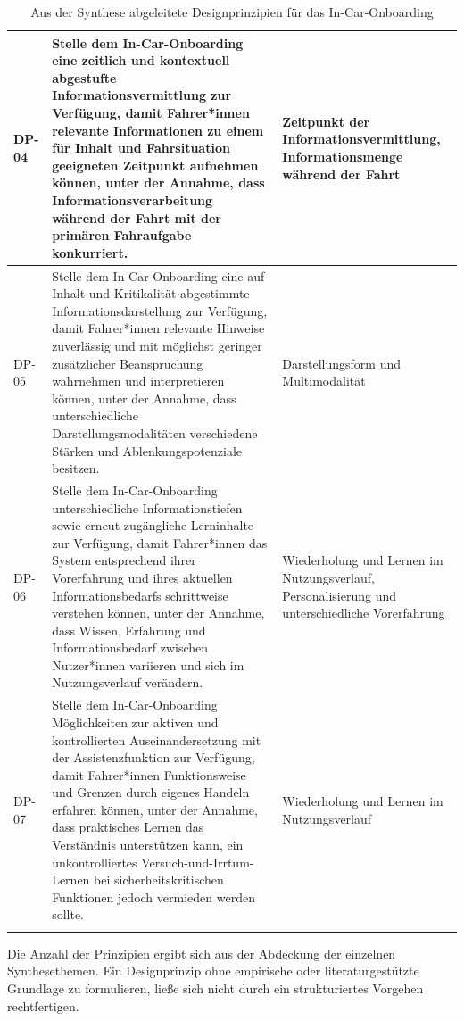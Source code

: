 {\begin{xltabular}{\textwidth}{
    |P{0.07\textwidth}
    |Y
    |P{0.24\textwidth}|
}
DP-04 &
Stelle dem In-Car-Onboarding eine zeitlich und kontextuell abgestufte
Informationsvermittlung zur Verfügung, damit Fahrer*innen relevante
Informationen zu einem für Inhalt und Fahrsituation geeigneten Zeitpunkt
aufnehmen können, unter der Annahme, dass Informationsverarbeitung während der
Fahrt mit der primären Fahraufgabe konkurriert. &
Zeitpunkt der Informationsvermittlung, Informationsmenge während der Fahrt
\\
\hline

DP-05 &
Stelle dem In-Car-Onboarding eine auf Inhalt und Kritikalität abgestimmte
Informationsdarstellung zur Verfügung, damit Fahrer*innen relevante Hinweise
zuverlässig und mit möglichst geringer zusätzlicher Beanspruchung wahrnehmen
und interpretieren können, unter der Annahme, dass unterschiedliche
Darstellungsmodalitäten verschiedene Stärken und Ablenkungspotenziale besitzen. &
Darstellungsform und Multimodalität
\\
\hline

DP-06 &
Stelle dem In-Car-Onboarding unterschiedliche Informationstiefen sowie erneut
zugängliche Lerninhalte zur Verfügung, damit Fahrer*innen das System
entsprechend ihrer Vorerfahrung und ihres aktuellen Informationsbedarfs
schrittweise verstehen können, unter der Annahme, dass Wissen, Erfahrung und
Informationsbedarf zwischen Nutzer*innen variieren und sich im Nutzungsverlauf
verändern. &
Wiederholung und Lernen im Nutzungsverlauf, Personalisierung und unterschiedliche Vorerfahrung
\\
\hline

DP-07 &
Stelle dem In-Car-Onboarding Möglichkeiten zur aktiven und kontrollierten
Auseinandersetzung mit der Assistenzfunktion zur Verfügung, damit Fahrer*innen
Funktionsweise und Grenzen durch eigenes Handeln erfahren können, unter der
Annahme, dass praktisches Lernen das Verständnis unterstützen kann, ein
unkontrolliertes Versuch-und-Irrtum-Lernen bei sicherheitskritischen Funktionen
jedoch vermieden werden sollte. &
Wiederholung und Lernen im Nutzungsverlauf
\\
\hline

\caption{Aus der Synthese abgeleitete Designprinzipien für das In-Car-Onboarding}
\label{tab:designprinzipien}
\\

\end{xltabular}
}

Die Anzahl der Prinzipien ergibt sich aus der Abdeckung der einzelnen Synthesethemen. Ein Designprinzip ohne empirische oder literaturgestützte Grundlage zu formulieren, ließe sich nicht durch ein strukturiertes Vorgehen rechtfertigen.

